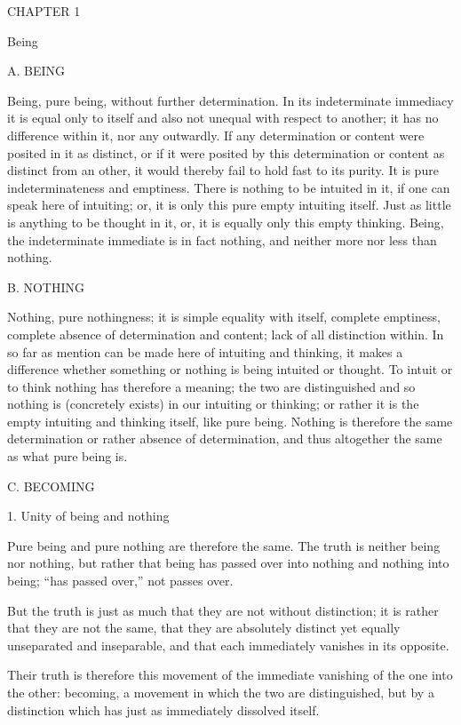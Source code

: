 CHAPTER 1

Being

A. BEING

Being, pure being, without further determination.
In its indeterminate immediacy it is equal only to itself
and also not unequal with respect to another;
it has no difference within it, nor any outwardly.
If any determination or content were posited in it as distinct,
or if it were posited by this determination or content
as distinct from an other,
it would thereby fail to hold fast to its purity.
It is pure indeterminateness and emptiness.
There is nothing to be intuited in it,
if one can speak here of intuiting;
or, it is only this pure empty intuiting itself.
Just as little is anything to be thought in it,
or, it is equally only this empty thinking.
Being, the indeterminate immediate is in fact nothing,
and neither more nor less than nothing.

B. NOTHING

Nothing, pure nothingness;
it is simple equality with itself,
complete emptiness,
complete absence of determination and content;
lack of all distinction within.
In so far as mention can be made here of
intuiting and thinking,
it makes a difference whether something or nothing is
being intuited or thought.
To intuit or to think nothing has therefore a meaning;
the two are distinguished and so nothing is (concretely exists)
in our intuiting or thinking;
or rather it is the empty intuiting and thinking itself,
like pure being.
Nothing is therefore the same determination
or rather absence of determination,
and thus altogether the same as what pure being is.

C. BECOMING

1. Unity of being and nothing

Pure being and pure nothing are therefore the same.
The truth is neither being nor nothing,
but rather that being has passed over into nothing
and nothing into being;
“has passed over,” not passes over.

But the truth is just as much that
they are not without distinction;
it is rather that they are not the same,
that they are absolutely distinct
yet equally unseparated and inseparable,
and that each immediately vanishes in its opposite.

Their truth is therefore this movement of
the immediate vanishing of the one into the other:
becoming, a movement in which the two are distinguished,
but by a distinction which has just as immediately dissolved itself.

